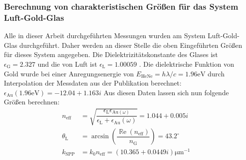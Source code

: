 \documentclass[titlepage]{article}
\renewcommand{\Re}{\operatorname{\mathbb{R}e}}
\begin{document}
		\subsubsection{Berechnung von charakteristischen Größen für das System Luft-Gold-Glas}
		Alle in dieser Arbeit durchgeführten Messungen wurden am System Luft-Gold-Glas durchgeführt. Daher werden an dieser Stelle die oben Eingeführten Größen für dieses System angegeben. Die Dielektrizitätskonstante des Glases ist $\epsilon_{\mathrm{G}} = 2.327$ \cite{Zeiss.} und die von Luft ist $\epsilon_{\mathrm{L}} = 1.00059$ \cite{Hippel.1995}. Die dielektrische Funktion von Gold wurde bei einer Anregungsenergie von $E_{\mathrm{HeNe}} = h\lambda/c = 1.96\mathrm{eV} $ durch Interpolation der Messdaten aus der Publikation \cite{Olmon.2012} berechnet: $\epsilon_{\mathrm{Au}}(1.96\mathrm{eV}) = -12.04 +1.163i$ Aus diesen Daten lassen sich nun folgende Größen berechnen:
		\begin{subequations}
			\begin{align}
				n_{\mathrm{eff}} &= \sqrt{\dfrac{\epsilon_{\mathrm{L}}\epsilon_{\mathrm{Au}(\omega)}}{\epsilon_{\mathrm{L}} + 	\epsilon_{\mathrm{Au}}(\omega)}} = 	1.044 + 0.005i \label{eq:theo_n_eff}\\			
				\theta_\mathrm{L} &=  \arcsin\left(\dfrac{\Re(n_{\mathrm{eff}})}{ n_\mathrm{G}}\right) = 43.2^\circ 
				\label{eq:theo_theta_l}\\
				k_{\mathrm{SPP}} &= k_0 n_{\mathrm{eff}} = (10.365 + 0.0449i)\mathrm{\mu m}^{-1}\label{eq:theo_k_spp}
			\end{align}
		\end{subequations}
\end{document}
